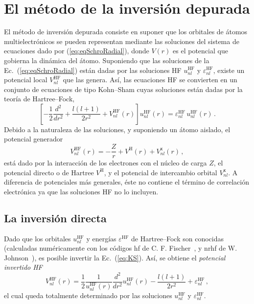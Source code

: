 \section{El método de la inversión depurada}
\label{sec:dimatomos}

El método de inversión depurada consiste en suponer que los orbitales
de átomos multielectrónicos se pueden representan mediante las 
soluciones del sistema de ecuaciones dado por (\ref{eq:eqSchroRadial}), 
donde $V(r)$ es el potencial que gobierna la dinámica del átomo. 
Suponiendo que las soluciones de la Ec.~(\ref{eq:eqSchroRadial}) están 
dadas por las soluciones HF $u_{nl}^{\mathrm{HF}}$ y 
$\varepsilon_{nl}^{\mathrm{HF}}$, existe un potencial local 
$V_{nl}^{\mathrm{HF}}$ que las genera. Así, las ecuaciones HF se 
convierten en un conjunto de ecuaciones de tipo Kohn--Sham cuyas 
soluciones están dadas por la teoría de Hartree--Fock,
\begin{equation}
\left[ 
-\frac{1}{2}\frac{d^{2}}{dr^{2}} + \frac{l(l+1)}{2r^{2}} + 
V_{nl}^{\mathrm{HF}}(r) 
\right] u_{nl}^{\mathrm{HF}}(r)
   = \varepsilon_{nl}^{\mathrm{HF}}\, u_{nl}^{\mathrm{HF}}(r) \, .
\label{eq:KS}
\end{equation}
Debido a la naturaleza de las soluciones, y suponiendo un átomo aislado, 
el potencial generador 
\begin{equation}
V_{nl}^{\mathrm{HF}}(r) = -\frac{Z}{r} + 
V^{\mathrm{H}}(r) + V_{nl}^{\mathrm{x}}(r) \, ,  
\label{eq:veff}
\end{equation}
está dado por la interacción de los electrones con el núcleo de carga 
$Z$, el potencial directo o de Hartree $V^{\mathrm{H}}$, y el potencial 
de intercambio orbital $V_{nl}^{\mathrm{x}}$. A diferencia de 
potenciales más generales, éste no contiene el término de correlación 
electrónica ya que las soluciones HF no lo incluyen. 


\subsection{La inversión directa}
\label{subsec:inversion}

Dado que los orbitales $u_{nl}^{\mathrm{HF}}$ y energías  
$\varepsilon^{\mathrm{HF}}$ de Hartree--Fock son conocidas (calculadas 
numéricamente con los códigos {\sc hf} de C. F. 
Fischer~\cite{FroeseFischer:97}, y {\sc nrhf} de 
W. Johnson~\cite{Johnson:07}), es posible invertir la Ec.~(\ref{eq:KS}). 
Así, se obtiene el \textit{potencial invertido HF} 
\begin{equation}
V_{nl}^{\mathrm{HF}}(r) = 
\frac{1}{2}\frac{1}{u_{nl}^{\mathrm{HF}}(r)}
\frac{d^2}{dr^{2}}u_{nl}^{\mathrm{HF}}(r) - 
\frac{l(l+1)}{2r^{2}}+\varepsilon _{nl}^{\mathrm{HF}} \,,
\label{eq:VHF}
\end{equation}
el cual queda totalmente determinado por las soluciones 
$u_{nl}^{\mathrm{HF}}$ y $\varepsilon_{nl}^{\mathrm{HF}}$.

